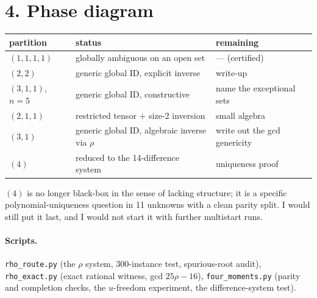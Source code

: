 \documentclass[11pt]{article}
\theoremstyle{remark}
\begin{document}
\section*{4. Phase diagram}

\begin{center}\small
\begin{tabular}{@{}lll@{}}
\toprule
partition & status & remaining\\
\midrule
$(1,1,1,1)$ & globally ambiguous on an open set & --- (certified)\\
$(2,2)$ & generic global ID, explicit inverse & write-up\\
$(3,1,1)$, $n=5$ & generic global ID, constructive & name the exceptional sets\\
$(2,1,1)$ & restricted tensor $+$ size-2 inversion & small algebra\\
$(3,1)$ & generic global ID, algebraic inverse via $\rho$ & write out the gcd genericity\\
$(4)$ & reduced to the 14-difference system & uniqueness proof\\
\bottomrule
\end{tabular}
\end{center}

$(4)$ is no longer black-box in the sense of lacking structure; it is a specific polynomial-uniqueness question in 11 unknowns with a clean parity split. I would still put it last, and I would not start it with further multistart runs.

\paragraph{Scripts.} \texttt{rho\_route.py} (the $\rho$ system, 300-instance test, spurious-root audit), \texttt{rho\_exact.py} (exact rational witness, gcd $25\rho-16$), \texttt{four\_moments.py} (parity and completion checks, the $u$-freedom experiment, the difference-system test).
\end{document}
